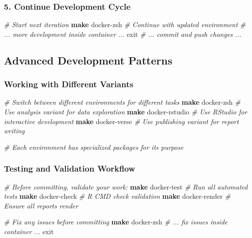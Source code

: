 \documentclass[
]{article}
\newenvironment{Shaded}{\begin{snugshade}}{\end{snugshade}}
\newcommand{\BuiltInTok}[1]{#1}
\newcommand{\CommentTok}[1]{\textcolor[rgb]{0.56,0.35,0.01}{\textit{#1}}}
\newcommand{\FunctionTok}[1]{\textcolor[rgb]{0.13,0.29,0.53}{\textbf{#1}}}
\newcommand{\NormalTok}[1]{#1}
\begin{document}
\subsubsection{5. Continue Development
Cycle}\label{continue-development-cycle}

\begin{Shaded}
\begin{Highlighting}[]
\CommentTok{\# Start next iteration}
\FunctionTok{make}\NormalTok{ docker{-}zsh              }\CommentTok{\# Continue with updated environment}
\CommentTok{\# ... more development inside container ...}
\BuiltInTok{exit}
\CommentTok{\# ... commit and push changes ...}
\end{Highlighting}
\end{Shaded}

\subsection{Advanced Development
Patterns}\label{advanced-development-patterns}

\subsubsection{Working with Different
Variants}\label{working-with-different-variants}

\begin{Shaded}
\begin{Highlighting}[]
\CommentTok{\# Switch between different environments for different tasks}
\FunctionTok{make}\NormalTok{ docker{-}zsh              }\CommentTok{\# Use analysis variant for data exploration}
\FunctionTok{make}\NormalTok{ docker{-}rstudio          }\CommentTok{\# Use RStudio for interactive development}
\FunctionTok{make}\NormalTok{ docker{-}verse            }\CommentTok{\# Use publishing variant for report writing}

\CommentTok{\# Each environment has specialized packages for its purpose}
\end{Highlighting}
\end{Shaded}

\subsubsection{Testing and Validation
Workflow}\label{testing-and-validation-workflow}

\begin{Shaded}
\begin{Highlighting}[]
\CommentTok{\# Before committing, validate your work:}
\FunctionTok{make}\NormalTok{ docker{-}test             }\CommentTok{\# Run all automated tests}
\FunctionTok{make}\NormalTok{ docker{-}check            }\CommentTok{\# R CMD check validation}
\FunctionTok{make}\NormalTok{ docker{-}render           }\CommentTok{\# Ensure all reports render}

\CommentTok{\# Fix any issues before committing}
\FunctionTok{make}\NormalTok{ docker{-}zsh}
\CommentTok{\# ... fix issues inside container ...}
\BuiltInTok{exit}
\end{Highlighting}
\end{Shaded}
\end{document}
